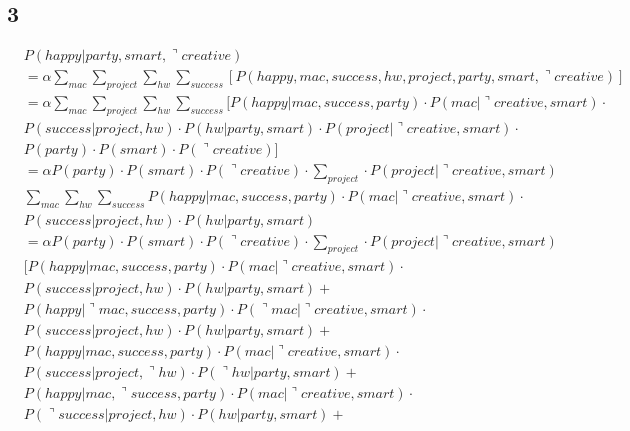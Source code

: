 \documentclass[letterpaper, 12pt]{artikel3}
\begin{document}
\subsection*{3}%
\begin{align*}
&P(happy| party, smart, \urcorner creative) \\
& = \alpha\sum_{mac} \sum_{project} \sum_{hw} \sum_{success} [P(happy, mac, success, hw, project,party,smart, \urcorner  creative) ] \\
& = \alpha\sum_{mac} \sum_{project} \sum_{hw} \sum_{success} [P(happy |mac, success, party)\cdot P(mac| \urcorner creative, smart) \cdot \\
& P(success | project, hw) \cdot P(hw| party, smart) \cdot P(project|\urcorner  creative, smart) \cdot \\
& P(party)\cdot P(smart) \cdot  P(\urcorner creative)]\\
& = \alpha  P(party)\cdot P(smart) \cdot  P(\urcorner creative)   \cdot \sum_{project}  \cdot  P(project|\urcorner  creative, smart) \\
& \sum_{mac}\sum_{hw} \sum_{success} P(happy |mac, success, party) \cdot P(mac| \urcorner creative, smart) \cdot \\
& P(success | project, hw) \cdot P(hw| party, smart) \\
& = \alpha  P(party)\cdot P(smart) \cdot  P(\urcorner creative)   \cdot \sum_{project}  \cdot  P(project|\urcorner  creative, smart)  \\
& [P(happy |mac, success, party) \cdot P(mac| \urcorner creative, smart) \cdot \\
& P(success | project, hw) \cdot P(hw| party, smart) +\\
& P(happy |\urcorner mac, success, party) \cdot P( \urcorner mac| \urcorner creative, smart) \cdot \\
& P(success | project, hw) \cdot P(hw| party, smart)  +\\
& P(happy |mac, success, party) \cdot P(mac| \urcorner creative, smart) \cdot \\
& P(success | project, \urcorner hw) \cdot P(\urcorner hw| party, smart) +\\
& P(happy |mac,\urcorner success, party) \cdot P(mac| \urcorner creative, smart) \cdot \\
& P(\urcorner success | project, hw) \cdot P(hw| party, smart) +\\

\end{align*}
\end{document}
